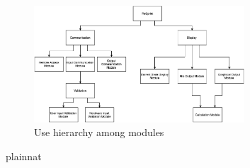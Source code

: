 \documentclass[12pt, titlepage]{article}
\begin{document}
\begin{figure}[H]
\centering
\includegraphics[width=0.7\textwidth]{UsesHierarchy.png}
\caption{Use hierarchy among modules}
\label{FigUH}
\end{figure}


 {plainnat}


\newpage{}
\end{document}
